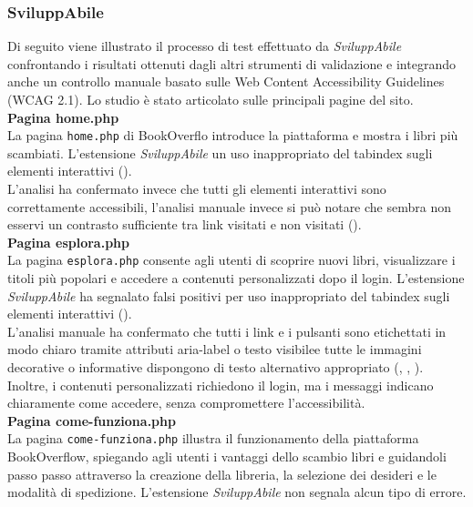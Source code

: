 \subsubsection{SviluppAbile}
\noindent Di seguito viene illustrato il processo di test effettuato da \textit{SviluppAbile} confrontando i risultati ottenuti dagli altri strumenti di validazione e integrando anche un controllo manuale basato sulle Web Content Accessibility Guidelines (WCAG 2.1). Lo studio è stato articolato sulle principali pagine del sito.\\

\noindent \textbf{Pagina home.php}\\
La pagina \texttt{home.php} di BookOverflo introduce la piattaforma e mostra i libri più scambiati. 
L’estensione \textit{SviluppAbile} un uso inappropriato del tabindex sugli elementi interattivi ({}).\\
L’analisi ha confermato invece che tutti gli elementi interattivi sono correttamente accessibili, l'analisi manuale invece si può notare che sembra non esservi un contrasto sufficiente tra link visitati e non visitati ({}).\\

\noindent \textbf{Pagina esplora.php}\\
La pagina \texttt{esplora.php} consente agli utenti di scoprire nuovi libri, visualizzare i titoli più popolari e accedere a contenuti personalizzati dopo il login. 
L’estensione \textit{SviluppAbile} ha segnalato falsi positivi per uso inappropriato del tabindex sugli elementi interattivi ({}).\\
L’analisi manuale ha confermato che tutti i link e i pulsanti sono etichettati in modo chiaro tramite attributi aria-label o testo visibilee tutte le immagini decorative o informative dispongono di testo alternativo appropriato ({}, {}, {}). Inoltre, i contenuti personalizzati richiedono il login, ma i messaggi indicano chiaramente come accedere, senza compromettere l’accessibilità.\\

\noindent \textbf{Pagina come-funziona.php}\\
La pagina \texttt{come-funziona.php} illustra il funzionamento della piattaforma BookOverflow, spiegando agli utenti i vantaggi dello scambio libri e guidandoli passo passo attraverso la creazione della libreria, la selezione dei desideri e le modalità di spedizione. 
L’estensione \textit{SviluppAbile} non segnala alcun tipo di errore.\\

